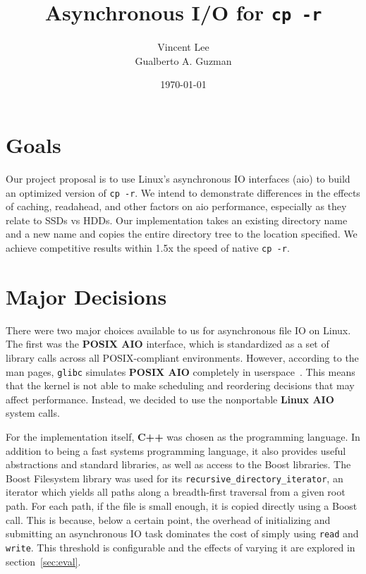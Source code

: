 \documentclass[11pt]{article}
\begin{document}
\title{Asynchronous I/O for \texttt{cp -r}}
\date{\today}
\author{Vincent Lee \\
        Gualberto A. Guzman}

\maketitle

\section{Goals} \label{sec:goals}

Our project proposal is to use Linux's asynchronous IO interfaces (aio) to build
an optimized version of \texttt{cp -r}. We intend to demonstrate differences in
the effects of caching, readahead, and other factors on aio performance,
especially as they relate to SSDs vs HDDs. Our implementation takes an existing
directory name and a new name and copies the entire directory tree to the
location specified. We achieve competitive results within 1.5x the speed of
native \texttt{cp -r}.

\section{Major Decisions} \label{sec:maj_dec}

There were two major choices available to us for asynchronous file IO on Linux.
The first was the \textbf{POSIX AIO} interface, which is standardized as a set
of library calls across all POSIX-compliant environments. However, according to
the man pages, \texttt{glibc} simulates \textbf{POSIX AIO} completely in
userspace~\cite{aio7}. This means that the kernel is not able to make scheduling
and reordering decisions that may affect performance. Instead, we decided to use
the nonportable \textbf{Linux AIO} system calls.

For the implementation itself, \textbf{C++} was chosen as the programming
language. In addition to being a fast systems programming language, it also
provides useful abstractions and standard libraries, as well as access to the
Boost libraries. The Boost Filesystem library was used for its
\texttt{recursive\_directory\_iterator}, an iterator which yields all paths
along a breadth-first traversal from a given root path. For each path, if the
file is small enough, it is copied directly using a Boost call. This is because,
below a certain point, the overhead of initializing and submitting an
asynchronous IO task dominates the cost of simply using \texttt{read} and
\texttt{write}. This threshold is configurable and the effects of varying it are
explored in section~\ref{sec:eval}.
\end{document}
